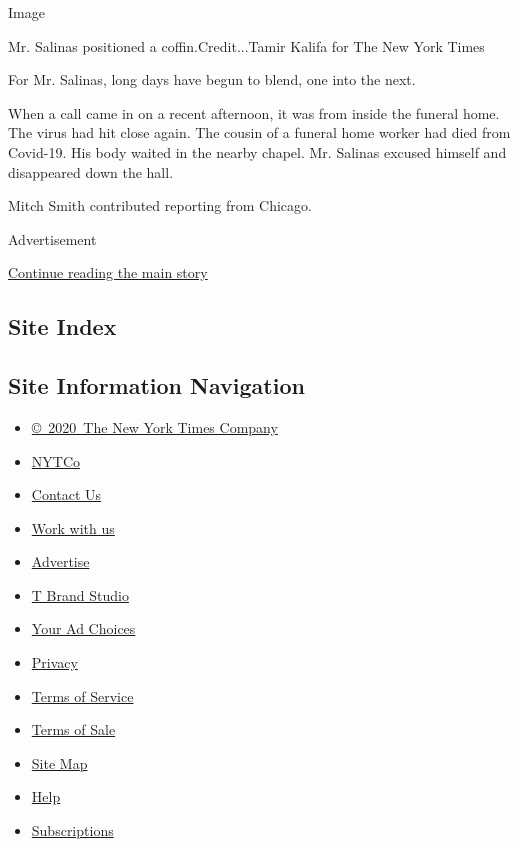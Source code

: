 Image

Mr. Salinas positioned a coffin.Credit...Tamir Kalifa for The New York
Times

For Mr. Salinas, long days have begun to blend, one into the next.

When a call came in on a recent afternoon, it was from inside the
funeral home. The virus had hit close again. The cousin of a funeral
home worker had died from Covid-19. His body waited in the nearby
chapel. Mr. Salinas excused himself and disappeared down the hall.

Mitch Smith contributed reporting from Chicago.

Advertisement

\protect\hyperlink{after-bottom}{Continue reading the main story}

\hypertarget{site-index}{%
\subsection{Site Index}\label{site-index}}

\hypertarget{site-information-navigation}{%
\subsection{Site Information
Navigation}\label{site-information-navigation}}

\begin{itemize}
\tightlist
\item
  \href{https://help.nytimes.com/hc/en-us/articles/115014792127-Copyright-notice}{©~2020~The
  New York Times Company}
\end{itemize}

\begin{itemize}
\tightlist
\item
  \href{https://www.nytco.com/}{NYTCo}
\item
  \href{https://help.nytimes.com/hc/en-us/articles/115015385887-Contact-Us}{Contact
  Us}
\item
  \href{https://www.nytco.com/careers/}{Work with us}
\item
  \href{https://nytmediakit.com/}{Advertise}
\item
  \href{http://www.tbrandstudio.com/}{T Brand Studio}
\item
  \href{https://www.nytimes.com/privacy/cookie-policy\#how-do-i-manage-trackers}{Your
  Ad Choices}
\item
  \href{https://www.nytimes.com/privacy}{Privacy}
\item
  \href{https://help.nytimes.com/hc/en-us/articles/115014893428-Terms-of-service}{Terms
  of Service}
\item
  \href{https://help.nytimes.com/hc/en-us/articles/115014893968-Terms-of-sale}{Terms
  of Sale}
\item
  \href{https://spiderbites.nytimes.com}{Site Map}
\item
  \href{https://help.nytimes.com/hc/en-us}{Help}
\item
  \href{https://www.nytimes.com/subscription?campaignId=37WXW}{Subscriptions}
\end{itemize}
